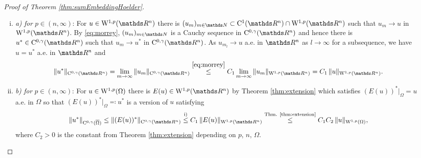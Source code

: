 \begin{proof}[Proof of Theorem \ref{thm:sumEmbeddingHoelder}]
  \begin{enumerate}[i)]
    \item \emph{a) for $p \in (n,\infty)$}:
      For $u \in \WW^{1,p}(\R^n)$ there is $(u_m)_{m \in \N} \subset \CC^1(\R^n) \cap \WW^{1,p}(\R^n)$ such that $u_m \to u$ in $\WW^{1,p}(\R^n)$.
      By \eqref{eq:morrey}, $(u_m)_{m \in \N}$ is a Cauchy sequence in $\CC^{0,\gamma}(\R^n)$ and hence there is $u^* \in \CC^{0,\gamma}(\R^n)$ such that $u_m \to u^*$ in $\CC^{0,\gamma}(\R^n)$.
      As $u_{m_l} \to u$ a.e. in $\R^n$ as $l \to \infty$ for a subsequence, we have $u = u^*$ a.e. in $\R^n$ and 
      $$
      \|u^*\|_{\CC^{0,\gamma}(\R^n)}
      = \lim_{m \to \infty} \| u_m\|_{\CC^{0,\gamma}(\R^n)}
      \overset{\eqref{eq:morrey}}{\leq} C_1 \lim_{m \to \infty} \|u_m\|_{\WW^{1,p}(\R^n)}
      = C_1 \, \|u\|_{\WW^{1,p}(\R^n)}.
      $$

    \item \emph{b) for $p \in (n,\infty)$}:
      For $u \in \mathrm{W}^{1,p}(\Omega)$ there is $E(u) \in \WW^{1,p}(\R^n)$ by Theorem \ref{thm:extension} which satisfies $(E(u))^*|_\Omega = u$ a.e. in $\Omega$ so that $(E(u))^*|_\Omega \eqqcolon u^*$ is a version of $u$ satisfying
      $$
      \|u^*\|_{\CC^{0,\gamma}(\overline\Omega)}
      \leq \| (E(u))^*\|_{\CC^{0,\gamma}(\R^n)}
      \overset{\text{i)}}{\leq} C_1 \, \|E(u)\|_{\WW^{1,p}(\R^n)}
      \overset{\text{Thm. \ref{thm:extension}}}{\leq} C_1 C_2 \, \|u\|_{\WW^{1,p}(\Omega)},
      $$
      where $C_2 > 0$ is the constant from Theorem \ref{thm:extension} depending on $p$, $n$, $\Omega$.


\end{enumerate}
\end{proof}

